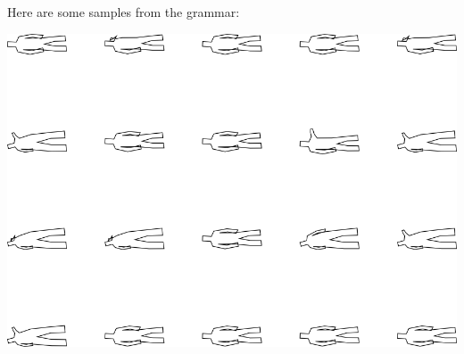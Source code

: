 Here are some samples from the grammar:

\includegraphics[width=6in]{output/3.learning/incremental/gram.3.d/samples.png}

